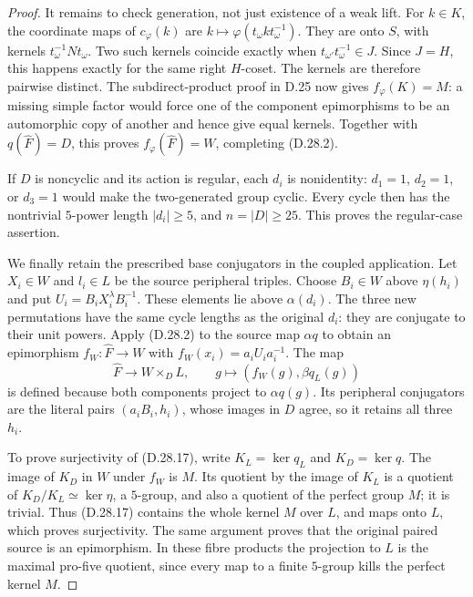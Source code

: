 \begin{proof}
It remains to check generation, not just existence of
a weak lift.  For $k\in K$, the coordinate maps of
$c_\varphi(k)$ are
$k\mapsto\varphi(t_\omega k t_\omega^{-1})$.
They are onto $S$, with kernels
$t_\omega^{-1}Nt_\omega$.  Two such kernels coincide
exactly when $t_{\omega'}t_\omega^{-1}\in J$.
Since $J=H$, this happens exactly for the same right
$H$-coset.  The kernels are therefore pairwise distinct.
The subdirect-product proof in D.25 now gives
$f_\varphi(K)=M$: a missing simple factor would force
one of the component epimorphisms to be an automorphic
copy of another and hence give equal kernels.
Together with $q(\widehat F)=D$, this proves
$f_\varphi(\widehat F)=W$, completing
\textup{(D.28.2)}.

If $D$ is noncyclic and its action is regular, each
$d_i$ is nonidentity: $d_1=1$, $d_2=1$, or
$d_3=1$ would make the two-generated group cyclic.
Every cycle then has the nontrivial $5$-power length
$|d_i|\geq5$, and $n=|D|\geq25$.
This proves the regular-case assertion.

We finally retain the prescribed base conjugators in
the coupled application.  Let $X_i\in W$ and
$l_i\in L$ be the source peripheral triples.  Choose
$B_i\in W$ above $\eta(h_i)$ and put
$U_i=B_iX_i^\lambda B_i^{-1}$.
These elements lie above $\alpha(d_i)$.
The three new permutations have the same cycle lengths
as the original $d_i$: they are conjugate to their
unit powers.  Apply \textup{(D.28.2)} to the source
map $\alpha q$ to obtain an epimorphism
$f_W:\widehat F\to W$ with
$f_W(x_i)=a_iU_ia_i^{-1}$.
The map
\[
 \widehat F\longrightarrow W\times_D L,
 \qquad g\longmapsto(f_W(g),\beta q_L(g))
 \tag{D.28.17}
\]
is defined because both components project to
$\alpha q(g)$.  Its peripheral conjugators are
the literal pairs $(a_iB_i,h_i)$, whose images in
$D$ agree, so it retains all three $h_i$.

To prove surjectivity of \textup{(D.28.17)}, write
$K_L=\ker q_L$ and $K_D=\ker q$.
The image of $K_D$ in $W$ under $f_W$ is $M$.
Its quotient by the image of $K_L$ is a quotient of
$K_D/K_L\simeq\ker\eta$, a $5$-group, and also a
quotient of the perfect group $M$; it is trivial.
Thus \textup{(D.28.17)} contains the whole kernel
$M$ over $L$, and maps onto $L$, which proves
surjectivity.  The same argument proves that the
original paired source is an epimorphism.  In these
fibre products the projection to $L$ is the maximal
pro-five quotient, since every map to a finite
$5$-group kills the perfect kernel $M$.


\end{proof}
